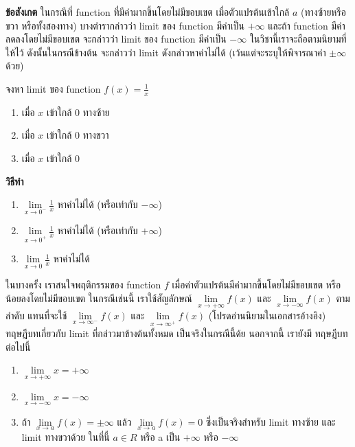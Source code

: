 \documentclass[
]{book}
\begin{document}
\textbf{ข้อสังเกต} ในกรณีที่ function ที่มีค่ามากขึ้นโดยไม่มีขอบเขต เมื่อตัวแปรต้นเข้าใกล้
\(a\) (ทางซ้ายหรือขวา หรือทั้งสองทาง) บางตำรากล่าวว่า limit ของ function มีค่าเป็น
\(+\infty\) และถ้า function มีค่าลดลงโดยไม่มีขอบเขต จะกล่าวว่า limit ของ
function มีค่าเป็น \(-\infty\) ในวิชานี้เราจะถือตามนิยามที่ให้ไว้ ดังนั้นในกรณีข้างต้น
จะกล่าวว่า limit ดังกล่าวหาค่าไม่ได้ (เว้นแต่จะระบุให้พิจารณาค่า \(\pm \infty\) ด้วย)

\label{ex-limit-6}
จงหา limit ของ function \(f\left( x\right) =\frac{1}{x}\)

\begin{enumerate}
\def\labelenumi{\arabic{enumi}.}
\item
  เมื่อ \(x\) เข้าใกล้ 0 ทางซ้าย
\item
  เมื่อ \(x\) เข้าใกล้ 0 ทางขวา
\item
  เมื่อ \(x\) เข้าใกล้ 0
\end{enumerate}

\textbf{วิธีทำ}

\begin{enumerate}
\def\labelenumi{\arabic{enumi}.}
\item
  \(\underset{x\rightarrow 0^{-}}{\lim}\frac{1}{x}\) หาค่าไม่ได้ (หรือเท่ากับ
  \(-\infty\))
\item
  \(\underset{x\rightarrow 0^{+}}{\lim}\frac{1}{x}\) หาค่าไม่ได้ (หรือเท่ากับ
  \(+\infty\))
\item
  \(\underset{x\rightarrow 0}{\lim}\frac{1}{x}\) หาค่าไม่ได้
\end{enumerate}

ในบางครั้ง เราสนใจพฤติกรรมของ function \(f\)
เมื่อค่าตัวแปรต้นมีค่ามากขึ้นโดยไม่มีขอบเขต หรือน้อยลงโดยไม่มีขอบเขต ในกรณีเช่นนี้
เราใช้สัญลักษณ์ \(\underset{x\rightarrow +\infty }{\lim}f\left( x\right)\)
และ \(\underset{x\rightarrow -\infty }{\lim}f\left( x\right)\) ตามลำดับ
แทนที่จะใช้ \(\underset{x\rightarrow \infty ^{-}}{\lim}f\left( x\right)\)
และ \(\underset{x\rightarrow \infty ^{+}}{\lim}f\left( x\right)\)
(โปรดอ่านนิยามในเอกสารอ้างอิง) ทฤษฎีบทเกี่ยวกับ limit ที่กล่าวมาข้างต้นทั้งหมด
เป็นจริงในกรณีนี้ด้ย นอกจากนี้ เรายังมี ทฤษฎีบทต่อไปนี้

\label{thm-limit-5}
\begin{enumerate}
\def\labelenumi{\arabic{enumi}.}
\item
  \(\underset{x\rightarrow +\infty }{\lim}x=+\infty\)
\item
  \(\underset{x\rightarrow -\infty }{\lim}x=-\infty\)
\item
  ถ้า \(\underset{x\rightarrow a}{\lim}f\left( x\right) =\pm \infty\) แล้ว
  \(\underset{x\rightarrow a}{\lim}f\left( x\right) =0\) ซึ่งเป็นจริงสำหรับ
  limit ทางซ้าย และ limit ทางขวาด้วย ในที่นี้ \(a\in R\) หรือ a เป็น \(+\infty\)
  หรือ \(-\infty\)
\end{enumerate}
\end{document}
